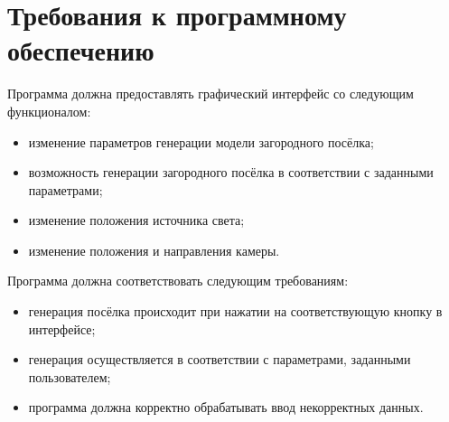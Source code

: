 \section{Требования к программному обеспечению}

Программа должна предоставлять графический интерфейс со следующим функционалом:
\begin{itemize}
    \item изменение параметров генерации модели загородного посёлка;
    \item возможность генерации загородного посёлка в соответствии с заданными параметрами;
    \item изменение положения источника света;
    \item изменение положения и направления камеры.
\end{itemize}

Программа должна соответствовать следующим требованиям:
\begin{itemize}
    \item генерация посёлка происходит при нажатии на соответствующую кнопку в интерфейсе;
    \item генерация осуществляется в соответствии с параметрами, заданными пользователем;
    \item программа должна корректно обрабатывать ввод некорректных данных.
\end{itemize}
